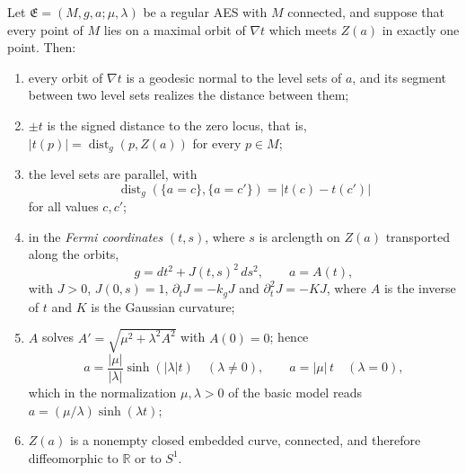 \begin{proposition}\label{prop:p0-normal-form}
Let $\mathfrak E=(M,g,a;\mu,\lambda)$ be a regular AES with $M$ connected, and
suppose that every point of $M$ lies on a maximal orbit of $\nabla t$ which meets
$Z(a)$ in exactly one point.  Then:
\begin{enumerate}
\item every orbit of $\nabla t$ is a geodesic normal to the level sets of $a$,
and its segment between two level sets realizes the distance between them;
\item $\pm t$ is the signed distance to the zero locus, that is,
$|t(p)|=\operatorname{dist}_g(p,Z(a))$ for every $p\in M$;
\item the level sets are parallel, with
\begin{equation}\label{eq:p0-parallel-levels}
 \operatorname{dist}_g(\{a=c\},\{a=c'\})=|t(c)-t(c')|
\end{equation}
for all values $c,c'$;
\item in the \emph{Fermi coordinates} $(t,s)$, where $s$ is arclength on $Z(a)$
transported along the orbits,
\begin{equation}\label{eq:p0-fermi-form}
 g=dt^2+J(t,s)^2\,ds^2,
 \qquad a=A(t),
\end{equation}
with $J>0$, $J(0,s)=1$, $\partial_tJ=-k_gJ$ and $\partial_t^2J=-KJ$, where $A$ is
the inverse of $t$ and $K$ is the Gaussian curvature;
\item $A$ solves $A'=\sqrt{\mu^2+\lambda^2A^2}$ with $A(0)=0$; hence
\begin{equation}\label{eq:p0-normal-form-assignment}
 a=\frac{|\mu|}{|\lambda|}\sinh(|\lambda|t)\quad(\lambda\ne0),
 \qquad a=|\mu|\,t\quad(\lambda=0),
\end{equation}
which in the normalization $\mu,\lambda>0$ of the basic model reads
$a=(\mu/\lambda)\sinh(\lambda t)$;
\item $Z(a)$ is a nonempty closed embedded curve, connected, and therefore
diffeomorphic to $\mathbb R$ or to $S^1$.
\end{enumerate}
\end{proposition}

